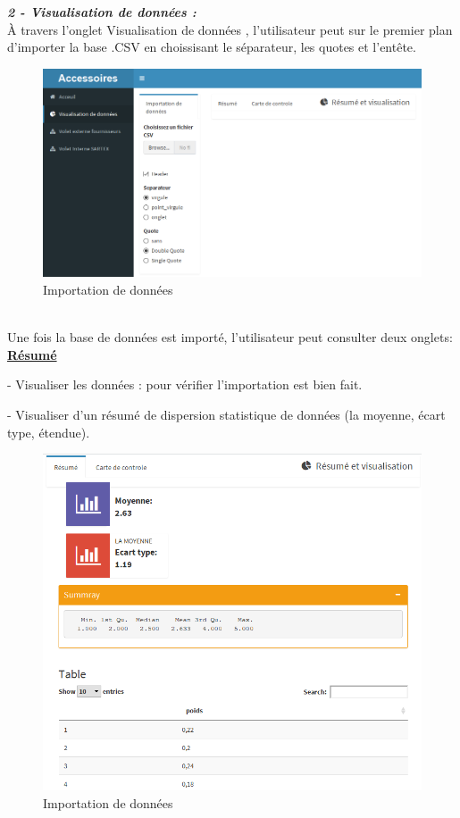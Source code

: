 \documentclass[12pt, a4paper]{thesis}
\begin{document}
 
 
\textit{\textbf{ 2 - Visualisation de données :}} \\
 À travers l'onglet Visualisation de données , l'utilisateur peut sur le premier plan d'importer la base .CSV en choissisant le séparateur, les quotes et l'entête.\\
 \begin{figure}[!h]
\begin{center} 
\includegraphics[scale=0.5]{appimpo} 
\caption{Importation de données}
\end{center}
\end{figure}\\
Une fois la base de données est importé, l'utilisateur peut consulter deux onglets:\\
\underline{\textbf{Résumé}}
\item - Visualiser les données : pour vérifier l'importation est bien fait.
\item - Visualiser d'un résumé de dispersion statistique de données (la moyenne, écart type,  étendue).\\

\begin{figure}[!h]
\begin{center} 
\includegraphics[scale=0.45]{appres} 
\caption{Importation de données}
\end{center}
\end{figure}
\end{document}
